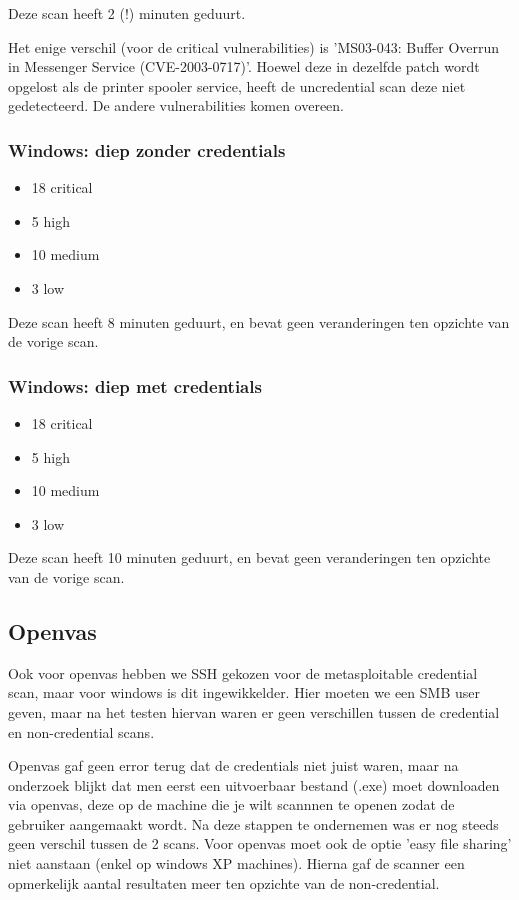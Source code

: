 Deze scan heeft 2 (!) minuten geduurt.

Het enige verschil (voor de critical vulnerabilities) is 'MS03-043: Buffer Overrun in Messenger Service (CVE-2003-0717)'. Hoewel deze in dezelfde patch wordt opgelost als de printer spooler service, heeft de uncredential scan deze niet gedetecteerd. De andere vulnerabilities komen overeen.

\subsubsection{Windows: diep zonder credentials}

\begin{itemize}
\item 18 critical
\item 5 high
\item 10 medium
\item 3 low
\end{itemize}

Deze scan heeft 8 minuten geduurt, en bevat geen veranderingen ten opzichte van de vorige scan.

\subsubsection{Windows: diep met credentials}

\begin{itemize}
\item 18 critical
\item 5 high
\item 10 medium
\item 3 low
\end{itemize}

Deze scan heeft 10 minuten geduurt, en bevat geen veranderingen ten opzichte van de vorige scan.

\subsection{Openvas}

Ook voor openvas hebben we SSH gekozen voor de metasploitable credential scan, maar voor windows is dit ingewikkelder. Hier moeten we een SMB user geven, maar na het testen hiervan waren er geen verschillen tussen de credential en non-credential scans. 

Openvas gaf geen error terug dat de credentials niet juist waren, maar na onderzoek blijkt dat men eerst een uitvoerbaar bestand (.exe) moet downloaden via openvas, deze op de machine die je wilt scannnen te openen zodat de gebruiker aangemaakt wordt. Na deze stappen te ondernemen was er nog steeds geen verschil tussen de 2 scans. Voor openvas moet ook de optie 'easy file sharing' niet aanstaan (enkel op windows XP machines). Hierna gaf de scanner een opmerkelijk aantal resultaten meer ten opzichte van de non-credential.

